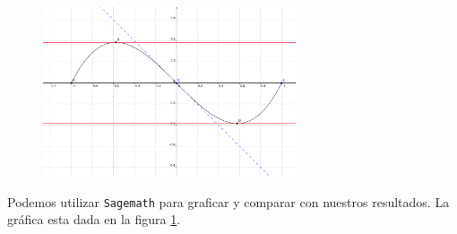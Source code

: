     \begin{figure}
        \centering
        \includegraphics[height=5cm,bb=0 0 681 456,keepaspectratio=true]{./calculo/ejemplo_graficacion.png}
        \label{fig:demo:grafica}
    \end{figure}


    
    Podemos utilizar \texttt{Sagemath} para graficar y comparar con nuestros resultados. La gráfica esta dada en la figura
    \ref{fig:demo:grafica}.
    

